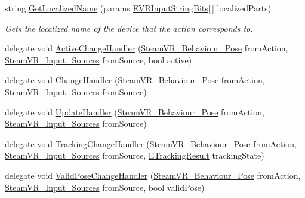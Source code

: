\begin{DoxyCompactItemize}
string \mbox{\hyperlink{class_valve_1_1_v_r_1_1_steam_v_r___behaviour___pose_a8ce88c34c63f922b59292680a5c0803a}{Get\+Localized\+Name}} (params \mbox{\hyperlink{namespace_valve_1_1_v_r_a05e76187bbc5846b9bfb44f6acf13912}{E\+V\+R\+Input\+String\+Bits}}\mbox{[}$\,$\mbox{]} localized\+Parts)
\begin{DoxyCompactList}\small\item\em Gets the localized name of the device that the action corresponds to. \end{DoxyCompactList}\item 
delegate void \mbox{\hyperlink{class_valve_1_1_v_r_1_1_steam_v_r___behaviour___pose_a7730a086ee26d198ce89285c305151d1}{Active\+Change\+Handler}} (\mbox{\hyperlink{class_valve_1_1_v_r_1_1_steam_v_r___behaviour___pose}{Steam\+V\+R\+\_\+\+Behaviour\+\_\+\+Pose}} from\+Action, \mbox{\hyperlink{namespace_valve_1_1_v_r_a82e5bf501cc3aa155444ee3f0662853f}{Steam\+V\+R\+\_\+\+Input\+\_\+\+Sources}} from\+Source, bool active)
\item 
delegate void \mbox{\hyperlink{class_valve_1_1_v_r_1_1_steam_v_r___behaviour___pose_abfdfc35f49754198589572579c59bcc2}{Change\+Handler}} (\mbox{\hyperlink{class_valve_1_1_v_r_1_1_steam_v_r___behaviour___pose}{Steam\+V\+R\+\_\+\+Behaviour\+\_\+\+Pose}} from\+Action, \mbox{\hyperlink{namespace_valve_1_1_v_r_a82e5bf501cc3aa155444ee3f0662853f}{Steam\+V\+R\+\_\+\+Input\+\_\+\+Sources}} from\+Source)
\item 
delegate void \mbox{\hyperlink{class_valve_1_1_v_r_1_1_steam_v_r___behaviour___pose_af2fee0ef3ee6fee2917805bb050216c2}{Update\+Handler}} (\mbox{\hyperlink{class_valve_1_1_v_r_1_1_steam_v_r___behaviour___pose}{Steam\+V\+R\+\_\+\+Behaviour\+\_\+\+Pose}} from\+Action, \mbox{\hyperlink{namespace_valve_1_1_v_r_a82e5bf501cc3aa155444ee3f0662853f}{Steam\+V\+R\+\_\+\+Input\+\_\+\+Sources}} from\+Source)
\item 
delegate void \mbox{\hyperlink{class_valve_1_1_v_r_1_1_steam_v_r___behaviour___pose_a699268c8115abe175fc4cbd41cb99c11}{Tracking\+Change\+Handler}} (\mbox{\hyperlink{class_valve_1_1_v_r_1_1_steam_v_r___behaviour___pose}{Steam\+V\+R\+\_\+\+Behaviour\+\_\+\+Pose}} from\+Action, \mbox{\hyperlink{namespace_valve_1_1_v_r_a82e5bf501cc3aa155444ee3f0662853f}{Steam\+V\+R\+\_\+\+Input\+\_\+\+Sources}} from\+Source, \mbox{\hyperlink{namespace_valve_1_1_v_r_abe6feab98f33191b7c27b4292012e90a}{E\+Tracking\+Result}} tracking\+State)
\item 
delegate void \mbox{\hyperlink{class_valve_1_1_v_r_1_1_steam_v_r___behaviour___pose_abe1b44cd414dbcb2eff3ce7b0ea7fb94}{Valid\+Pose\+Change\+Handler}} (\mbox{\hyperlink{class_valve_1_1_v_r_1_1_steam_v_r___behaviour___pose}{Steam\+V\+R\+\_\+\+Behaviour\+\_\+\+Pose}} from\+Action, \mbox{\hyperlink{namespace_valve_1_1_v_r_a82e5bf501cc3aa155444ee3f0662853f}{Steam\+V\+R\+\_\+\+Input\+\_\+\+Sources}} from\+Source, bool valid\+Pose)

\end{DoxyCompactItemize}
